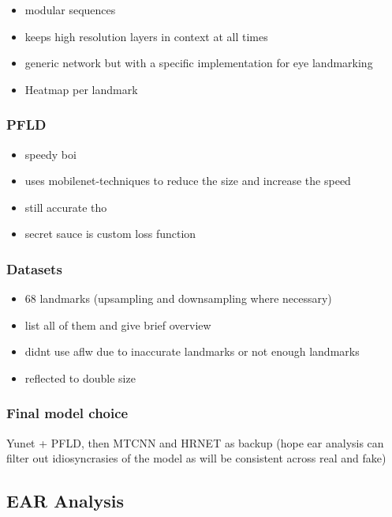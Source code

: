 \begin{itemize}
    \item modular sequences
    \item keeps high resolution layers in context at all times
    \item generic network but with a specific implementation for eye landmarking
    \item Heatmap per landmark
\end{itemize}

\subsubsection{PFLD}

\begin{itemize}
    \item speedy boi
    \item uses mobilenet-techniques to reduce the size and increase the speed
    \item still accurate tho
    \item secret sauce is custom loss function
\end{itemize}

\subsubsection{Datasets}

\begin{itemize}
    \item 68 landmarks (upsampling and downsampling where necessary)
    \item list all of them and give brief overview
    \item didnt use aflw due to inaccurate landmarks or not enough landmarks
    \item reflected to double size
\end{itemize}

\subsubsection{Final model choice}

Yunet + PFLD, then MTCNN and HRNET as backup (hope ear analysis can filter out idiosyncrasies of the model as will be consistent across real and fake)

\subsection{EAR Analysis}

